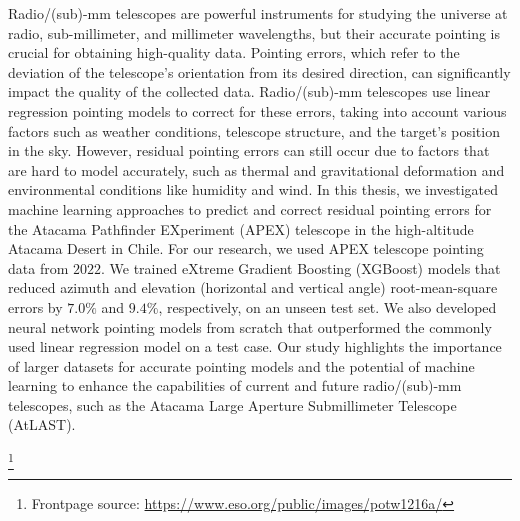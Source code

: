 

Radio/(sub)-mm telescopes are powerful instruments for studying the universe at radio, sub-millimeter, and millimeter wavelengths, but their accurate pointing is crucial for obtaining high-quality data.
Pointing errors, which refer to the deviation of the telescope's orientation from its desired direction, can significantly impact the quality of the collected data.
Radio/(sub)-mm telescopes use linear regression pointing models to correct for these errors, taking into account various factors such as weather conditions, telescope structure, and the target's position in the sky.
However, residual pointing errors can still occur due to factors that are hard to model accurately, such as thermal and gravitational deformation and environmental conditions like humidity and wind.
In this thesis, we investigated machine learning approaches to predict and correct residual pointing errors for the Atacama Pathfinder EXperiment (APEX) telescope in the high-altitude Atacama Desert in Chile.
For our research, we used APEX telescope pointing data from $2022$.
We trained eXtreme Gradient Boosting (XGBoost) models that reduced azimuth and elevation (horizontal and vertical angle) root-mean-square errors by $7.0\%$ and $9.4\%$,
respectively, on an unseen test set. We also developed neural network pointing models from scratch that outperformed the commonly used linear regression model on a test case.
Our study highlights the importance of larger datasets for accurate pointing models and the potential of machine learning to enhance the capabilities of current and future radio/(sub)-mm telescopes,
such as the Atacama Large Aperture Submillimeter Telescope (AtLAST).

\footnote[]{Frontpage source: \url{https://www.eso.org/public/images/potw1216a/}}



